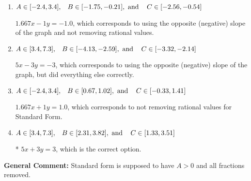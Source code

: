 \documentclass{extbook}[14pt]
\begin{document}
\begin{enumerate}
{\begin{enumerate}[label=\Alph*.]
 $-5x - 3y = -3$, which corresponds to not making $A$ positive (by multiplying the equation by $-1$).
\item \( A \in [-2.4, 3.4], \hspace{3mm} B \in [-1.75, -0.21], \text{ and } \hspace{3mm} C \in [-2.56, -0.54] \)

 $1.667x - 1y = -1.0$, which corresponds to using the opposite (negative) slope of the graph and not removing rational values.
\item \( A \in [3.4, 7.3], \hspace{3mm} B \in [-4.13, -2.59], \text{ and } \hspace{3mm} C \in [-3.32, -2.14] \)

 $5x - 3y = -3$, which corresponds to using the opposite (negative) slope of the graph, but did everything else correctly.
\item \( A \in [-2.4, 3.4], \hspace{3mm} B \in [0.67, 1.02], \text{ and } \hspace{3mm} C \in [-0.33, 1.41] \)

 $1.667x + 1y = 1.0$, which corresponds to not removing rational values for Standard Form.
\item \( A \in [3.4, 7.3], \hspace{3mm} B \in [2.31, 3.82], \text{ and } \hspace{3mm} C \in [1.33, 3.51] \)

* $5x + 3y = 3$, which is the correct option.
\end{enumerate}

\textbf{General Comment:} Standard form is supposed to have $A > 0$ and all fractions removed.
}
\end{enumerate}
\end{document}
